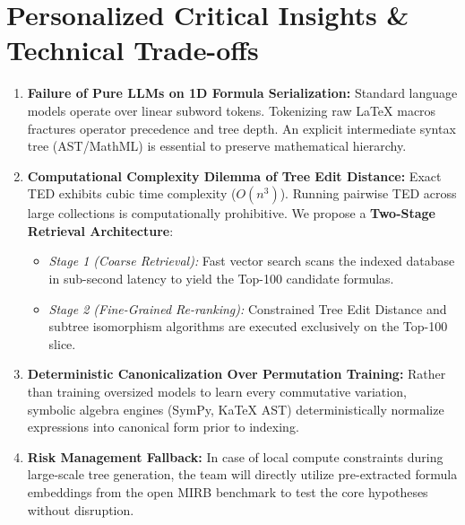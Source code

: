 \documentclass[11pt,a4paper]{article}
\begin{document}
\section{Personalized Critical Insights \& Technical Trade-offs}
\begin{enumerate}
	\item \textbf{Failure of Pure LLMs on 1D Formula Serialization:} Standard language models operate over linear subword tokens. Tokenizing raw \LaTeX{} macros fractures operator precedence and tree depth. An explicit intermediate syntax tree (AST/MathML) is essential to preserve mathematical hierarchy.
	\item \textbf{Computational Complexity Dilemma of Tree Edit Distance:} Exact TED exhibits cubic time complexity ($O(n^3)$). Running pairwise TED across large collections is computationally prohibitive. We propose a \textbf{Two-Stage Retrieval Architecture}:
	\begin{itemize}
		\item \textit{Stage 1 (Coarse Retrieval):} Fast vector search scans the indexed database in sub-second latency to yield the Top-100 candidate formulas.
		\item \textit{Stage 2 (Fine-Grained Re-ranking):} Constrained Tree Edit Distance and subtree isomorphism algorithms are executed exclusively on the Top-100 slice.
	\end{itemize}
	\item \textbf{Deterministic Canonicalization Over Permutation Training:} Rather than training oversized models to learn every commutative variation, symbolic algebra engines (SymPy, KaTeX AST) deterministically normalize expressions into canonical form prior to indexing.
	\item \textbf{Risk Management Fallback:} In case of local compute constraints during large-scale tree generation, the team will directly utilize pre-extracted formula embeddings from the open MIRB benchmark to test the core hypotheses without disruption.
\end{enumerate}
\end{document}
